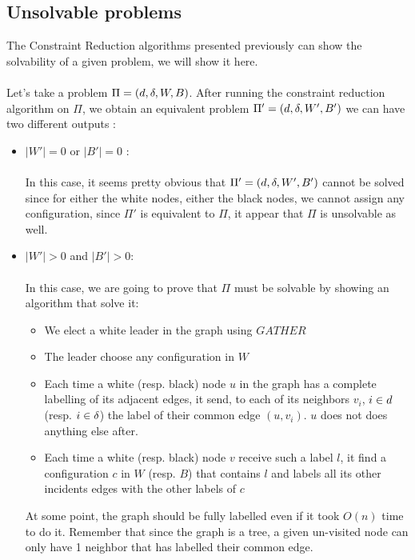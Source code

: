 \subsection{Unsolvable problems}
The Constraint Reduction algorithms presented previously can show the solvability of a given problem, we will show it here.\\\\
Let's take a problem $\Pi = (d,\delta,W,B)$. After running the constraint reduction algorithm on $\Pi$, we obtain an equivalent problem $\Pi' = (d,\delta,W',B')$ we can have two different outputs :
\begin{itemize}
    \item $|W'| = 0$ or $|B'| = 0$ : \\\\
    In this case, it seems pretty obvious that $\Pi' = (d,\delta,W',B')$ cannot be solved since for either the white nodes, either the black nodes, we cannot assign any configuration, since $\Pi'$ is equivalent to $\Pi$, it appear that $\Pi$ is unsolvable as well.
    \item  $|W'| > 0$ and $|B'| > 0$: \\\\
    In this case, we are going to prove that $\Pi$ must be solvable by showing an algorithm that solve it:
    \begin{itemize}
        \item We elect a white leader in the graph using $GATHER$
        \item The leader choose any configuration in $W$
        \item Each time a white (resp. black) node $u$ in the graph has a complete labelling of its adjacent edges, it send, to each of its neighbors $v_i$, $i\in d$ (resp. $i\in\delta$) the label of their common edge $(u,v_i)$. $u$ does not does anything else after.
        \item Each time a white (resp. black) node $v$ receive such a label $l$, it find a configuration $c$ in $W$ (resp. $B$) that contains $l$ and labels all its other incidents edges with the other labels of $c$
    \end{itemize}
    At some point, the graph should be fully labelled even if it took $O(n)$ time to do it. Remember that since the graph is a tree, a given un-visited node can only have 1 neighbor that has labelled their common edge.
\end{itemize}